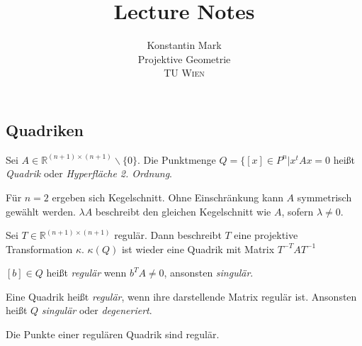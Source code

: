 \documentclass[11pt]{article}
\title{Lecture Notes}
\author{Konstantin Mark\\
Projektive Geometrie\\ 
\textsc{TU Wien}
}
\begin{document}
\maketitle

\subsection{Quadriken}


\begin{definition}
Sei $A\in \mathbb R^{(n+1)\times(n+1)}\backslash\{0\}$. Die Punktmenge $Q= \{[x]\in P^n|x^tAx = 0$ heißt \textit{Quadrik} oder \textit{Hyperfläche 2. Ordnung}.
\end{definition}
\begin{remark}
Für $n=2$ ergeben sich Kegelschnitt. Ohne Einschränkung kann $A$ symmetrisch gewählt werden. $\lambda A$ beschreibt den gleichen Kegelschnitt wie $A$, sofern $\lambda \neq 0$. 
\end{remark}
\begin{remark}
Sei $T\in \mathbb R^{(n+1)\times(n+1)}$ regulär. Dann beschreibt $T$ eine projektive Transformation $\kappa$. $\kappa(Q)$ ist wieder eine Quadrik mit Matrix $T^{-T}AT^{-1}$
\end{remark}
\begin{definition}
$[b]\in Q$ heißt \textit{regulär} wenn $b^TA\neq 0$, ansonsten \textit{singulär}.
\end{definition}
\begin{definition}
Eine Quadrik heißt \textit{regulär}, wenn ihre darstellende Matrix regulär ist. Ansonsten heißt $Q$ \textit{singulär} oder \textit{degeneriert}. 
\end{definition}
\begin{remark}
Die Punkte einer regulären Quadrik sind regulär.
\end{remark}
\end{document}
